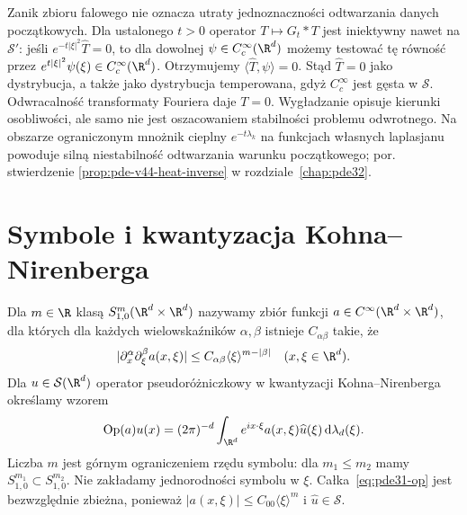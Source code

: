 \begin{uwaga}
Zanik zbioru falowego nie oznacza utraty
jednoznaczności odtwarzania danych początkowych.
Dla ustalonego $t>0$ operator $T\mapsto G_t*T$
jest iniektywny nawet na $\mathcal S'$:
jeśli $e^{-t|\xi|^2}\widehat T=0$, to dla
dowolnej $\psi\in C_c^\infty(\R^d)$ możemy
testować tę równość przez
$e^{t|\xi|^2}\psi(\xi)\in C_c^\infty(\R^d)$.
Otrzymujemy $\langle\widehat T,\psi\rangle=0$.
Stąd $\widehat T=0$ jako dystrybucja, a także
jako dystrybucja temperowana, gdyż
$C_c^\infty$ jest gęsta w $\mathcal S$.
Odwracalność transformaty Fouriera daje $T=0$.
Wygładzanie opisuje kierunki osobliwości,
ale samo nie jest oszacowaniem stabilności
problemu odwrotnego.
Na obszarze ograniczonym mnożnik cieplny
$e^{-t\lambda_k}$ na funkcjach własnych laplasjanu
powoduje silną niestabilność odtwarzania warunku
początkowego; por. stwierdzenie
\ref{prop:pde-v44-heat-inverse} w rozdziale~\ref{chap:pde32}.
\end{uwaga}


\section{Symbole i kwantyzacja Kohna--Nirenberga}
\begin{definicja}\label{def:pde31-symbol}
Dla $m\in\R$ klasą $S^m_{1,0}(\R^d\times\R^d)$
nazywamy zbiór funkcji $a\in C^\infty(\R^d\times\R^d)$,
dla których dla każdych wielowskaźników $\alpha,\beta$
istnieje $C_{\alpha\beta}$ takie, że
\begin{equation}\label{eq:pde31-symbol}
 |\partial_x^\alpha\partial_\xi^\beta a(x,\xi)|
 \le C_{\alpha\beta}\langle\xi\rangle^{m-|\beta|}
 \quad(x,\xi\in\R^d).
\end{equation}
Dla $u\in\mathcal S(\R^d)$ operator pseudoróżniczkowy
w kwantyzacji Kohna--Nirenberga określamy wzorem
\begin{equation}\label{eq:pde31-op}
 \operatorname{Op}(a)u(x)=(2\pi)^{-d}
 \int_{\R^d}e^{ix\cdot\xi}a(x,\xi)\widehat u(\xi)
 \,\mathrm d\lambda_d(\xi).
\end{equation}
Liczba $m$ jest górnym ograniczeniem rzędu symbolu:
dla $m_1\le m_2$ mamy $S^{m_1}_{1,0}\subset S^{m_2}_{1,0}$.
Nie zakładamy jednorodności symbolu w $\xi$.
Całka~\eqref{eq:pde31-op} jest bezwzględnie zbieżna,
ponieważ $|a(x,\xi)|\le C_{00}\langle\xi\rangle^m$
i $\widehat u\in\mathcal S$.
\end{definicja}

